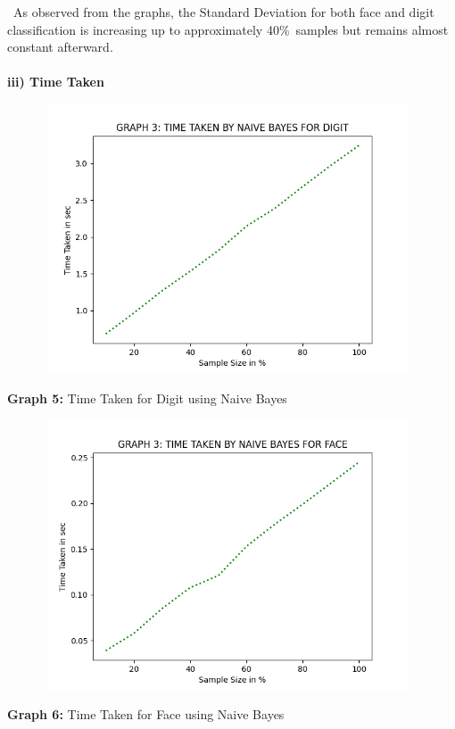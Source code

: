 \documentclass[10 pt]{report}   	%
\begin{document}
{\begin{center}
\end{center}
\textbullet\ As observed from the graphs, the Standard Deviation for both face and digit classification is increasing up to approximately 40\%\ samples but remains almost constant afterward. \\ \\
\textbf{iii) Time Taken}
\begin{figure} [H]
\includegraphics [width = 11cm, height = 8cm]{NB_TIME_DIGIT.png}
\end {figure}
\begin{center}
\small \textbf {Graph 5:} Time Taken for Digit using Naive Bayes\\
\end{center}
\begin{figure} [H]
\includegraphics [width = 11cm, height = 8cm]{NB_TIME_FACE.png}
\end {figure}
\begin{center}
\small \textbf {Graph 6:} Time Taken for Face using Naive Bayes\\

\end{center}}
\end{document}
